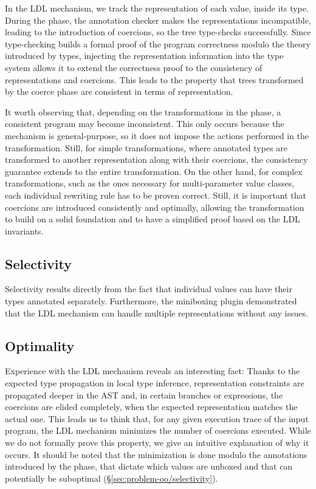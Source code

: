 In the LDL mechanism, we track the representation of each value, inside its type. During the \coerce{} phase, the annotation checker makes the representations incompatible, leading to the introduction of coercions, so the tree type-checks successfully. Since type-checking builds a formal proof of the program correctness modulo the theory introduced by types, injecting the representation information into the type system allows it to extend the correctness proof to the consistency of representations and coercions. This leads to the property that trees transformed by the coerce phase are consistent in terms of representation.

It worth observing that, depending on the transformations in the \commit{} phase, a consistent program may become inconsistent. This only occurs because the mechanism is general-purpose, so it does not impose the actions performed in the \commit{} transformation. Still, for simple transformations, where annotated types are transformed to another representation along with their coercions, the consistency guarantee extends to the entire transformation. On the other hand, for complex transformations, such as the ones necessary for multi-parameter value classes, each individual rewriting rule has to be proven correct. Still, it is important that coercions are introduced consistently and optimally, allowing the \commit{} transformation to build on a solid foundation and to have a simplified proof based on the LDL invariants.

\subsection{Selectivity}

Selectivity results directly from the fact that individual values can have their types annotated separately. Furthermore, the miniboxing plugin demonstrated that the LDL mechanism can handle multiple representations without any issues.

\subsection{Optimality}
\label{sec:transform-props/optimality}

Experience with the LDL mechanism reveals an interesting fact: Thanks to the expected type propagation in local type inference, representation constraints are propagated deeper in the AST and, in certain branches or expressions, the coercions are elided completely, when the expected representation matches the actual one. This leads us to think that, for any given execution trace of the input program, the LDL mechanism minimizes the number of coercions executed. While we do not formally prove this property, we give an intuitive explanation of why it occurs. It should be noted that the minimization is done modulo the annotations introduced by the \inject{} phase, that dictate which values are unboxed and that can potentially be suboptimal (\S\ref{sec:problem-oo/selectivity}).

